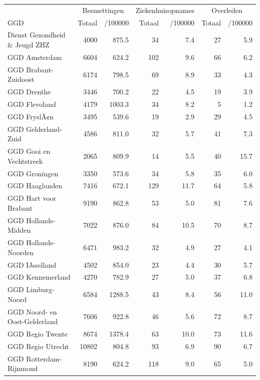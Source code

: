 \documentclass[
  english,
  man,floatsintext]{apa6}
\begin{document}
\begin{table}[H]
\centering\begingroup\fontsize{10}{12}\selectfont

\begin{threeparttable}
\begin{tabular}{lrrrrrr}
\toprule
\multicolumn{1}{c}{ } & \multicolumn{2}{c}{Besmettingen} & \multicolumn{2}{c}{Ziekenhuisopnames} & \multicolumn{2}{c}{Overleden} \\
\cmidrule(l{3pt}r{3pt}){2-3} \cmidrule(l{3pt}r{3pt}){4-5} \cmidrule(l{3pt}r{3pt}){6-7}
GGD & Totaal & /100000 & Totaal & /100000 & Totaal & /100000\\
\midrule
Dienst Gezondheid \& Jeugd ZHZ & 4000 & 875.5 & 34 & 7.4 & 27 & 5.9\\
GGD Amsterdam & 6604 & 624.2 & 102 & 9.6 & 66 & 6.2\\
GGD Brabant-Zuidoost & 6174 & 798.5 & 69 & 8.9 & 33 & 4.3\\
GGD Drenthe & 3446 & 700.2 & 22 & 4.5 & 19 & 3.9\\
GGD Flevoland & 4179 & 1003.3 & 34 & 8.2 & 5 & 1.2\\
GGD FryslÃ¢n & 3495 & 539.6 & 19 & 2.9 & 29 & 4.5\\
GGD Gelderland-Zuid & 4586 & 811.0 & 32 & 5.7 & 41 & 7.3\\
GGD Gooi en Vechtstreek & 2065 & 809.9 & 14 & 5.5 & 40 & 15.7\\
GGD Groningen & 3350 & 573.6 & 34 & 5.8 & 35 & 6.0\\
GGD Haaglanden & 7416 & 672.1 & 129 & 11.7 & 64 & 5.8\\
GGD Hart voor Brabant & 9190 & 862.8 & 53 & 5.0 & 81 & 7.6\\
GGD Hollands-Midden & 7022 & 876.0 & 84 & 10.5 & 70 & 8.7\\
GGD Hollands-Noorden & 6471 & 983.2 & 32 & 4.9 & 27 & 4.1\\
GGD IJsselland & 4502 & 854.0 & 23 & 4.4 & 30 & 5.7\\
GGD Kennemerland & 4270 & 782.9 & 27 & 5.0 & 37 & 6.8\\
GGD Limburg-Noord & 6584 & 1288.5 & 43 & 8.4 & 56 & 11.0\\
GGD Noord- en Oost-Gelderland & 7606 & 922.8 & 46 & 5.6 & 72 & 8.7\\
GGD Regio Twente & 8674 & 1378.4 & 63 & 10.0 & 73 & 11.6\\
GGD Regio Utrecht & 10802 & 804.8 & 93 & 6.9 & 90 & 6.7\\
GGD Rotterdam-Rijnmond & 8190 & 624.2 & 118 & 9.0 & 65 & 5.0\\

\end{tabular}
\end{threeparttable}
\end{table}
\end{document}

